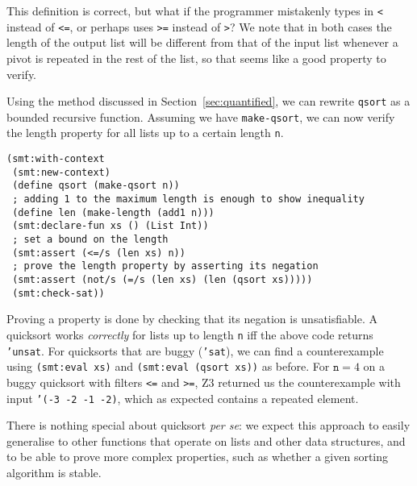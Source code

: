 This definition is correct, but what if the programmer mistakenly types in
\texttt{<} instead of \texttt{<=}, or perhaps uses \texttt{>=} instead of
\texttt{>}? We note that in both cases the length of the output list will be
different from that of the input list whenever a pivot is repeated in the rest
of the list, so that seems like a good property to verify.

Using the method discussed in Section~\ref{sec:quantified}, we can rewrite
\texttt{qsort} as a bounded recursive function. Assuming we have \texttt
{make-qsort}, we can now verify the length property for all lists up to a
certain length \texttt{n}.

\begin{verbatim}
(smt:with-context
 (smt:new-context)
 (define qsort (make-qsort n))
 ; adding 1 to the maximum length is enough to show inequality
 (define len (make-length (add1 n)))
 (smt:declare-fun xs () (List Int))
 ; set a bound on the length
 (smt:assert (<=/s (len xs) n))
 ; prove the length property by asserting its negation
 (smt:assert (not/s (=/s (len xs) (len (qsort xs)))))
 (smt:check-sat))
\end{verbatim}

Proving a property is done by checking that its negation is unsatisfiable. A
quicksort works \textit{correctly} for lists up to length \texttt{n} iff the above
code returns \texttt{'unsat}. For quicksorts that are buggy (\texttt{'sat}),
we can find a counterexample using \texttt{(smt:eval xs)} and
\texttt{(smt:eval (qsort xs))} as before. For $\mathtt{n}=4$ on a buggy quicksort with
filters \texttt{<=} and \texttt{>=}, Z3 returned us the counterexample with
input \texttt{'(-3 -2 -1 -2)}, which as expected contains a repeated element.

There is nothing special about quicksort \textit{per se}: we expect this
approach to easily generalise to other functions that operate on lists and
other data structures, and to be able to prove more complex properties, such
as whether a given sorting algorithm is stable.
